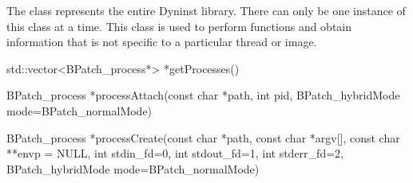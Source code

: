 The  class represents the entire Dyninst library. There can only be one instance
of this class at a time. This class is used to perform functions and obtain information that
is not specific to a particular thread or image.

\begin{apient}
std::vector<BPatch_process*> *getProcesses()
\end{apient}


\begin{apient}
BPatch_process *processAttach(const char *path, int pid, BPatch_hybridMode mode=BPatch_normalMode)

BPatch_process *processCreate(const char *path, const char *argv[], const char **envp = NULL,
                              int stdin_fd=0, int stdout_fd=1, int stderr_fd=2,
                              BPatch_hybridMode mode=BPatch_normalMode)
\end{apient}


